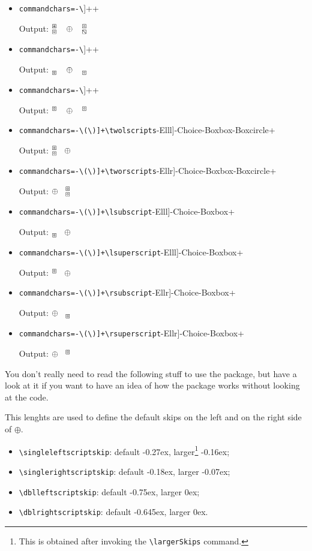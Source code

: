 \documentclass[green,a4paper,oneside,openany,noparindent,noparskip,article,nomatter]{bookest}
\newcommand{\choice}{\oplus} %
\begin{document}
\begin{itemize}
\item \Verb[commandchars=-\[\]]++

Output: $\fourscriptsC{\choice}{\boxast}{\boxbox}{\boxcircle}{\boxbslash}{2ex}{2ex}$
\item \Verb[commandchars=-\[\]]++

Output: $\lrsubscriptsC{\choice}{\boxbox}{\boxcircle}{2ex}{2ex}$
\item \Verb[commandchars=-\[\]]++

Output: $\lrsuperscriptsC{\choice}{\boxbox}{\boxcircle}{2ex}{2ex}$
\item \Verb[commandchars=-\(\)]+\twolscripts[-Elll]{-Choice}{-Boxbox}{-Boxcircle}+

Output: $\twolscripts[2ex]{\choice}{\boxbox}{\boxcircle}$
\item \Verb[commandchars=-\(\)]+\tworscripts[-Ellr]{-Choice}{-Boxbox}{-Boxcircle}+

Output: $\tworscripts[2ex]{\choice}{\boxbox}{\boxcircle}$
\item \Verb[commandchars=-\(\)]+\lsubscript[-Elll]{-Choice}{-Boxbox}+

Output: $\lsubscript[2ex]{\choice}{\boxbox}$
\item \Verb[commandchars=-\(\)]+\lsuperscript[-Elll]{-Choice}{-Boxbox}+

Output: $\lsuperscript[2ex]{\choice}{\boxbox}$
\item \Verb[commandchars=-\(\)]+\rsubscript[-Ellr]{-Choice}{-Boxbox}+

Output: $\rsubscript[2ex]{\choice}{\boxbox}$
\item \Verb[commandchars=-\(\)]+\rsuperscript[-Ellr]{-Choice}{-Boxbox}+

Output: $\rsuperscript[2ex]{\choice}{\boxbox}$
\end{itemize}


You don't really need to read the following stuff to use the package, but have a look at it if you want to have an idea of how the package works without looking at the code.

\label{lengths}
This lenghts are used to define the default skips on the left and on the right side of $\choice$.
\begin{itemize}
\item\Verb+\singleleftscriptskip+: default -0.27ex, larger\footnote{This is obtained after invoking the \verb+\largerSkips+ command.} -0.16ex;
\item\Verb+\singlerightscriptskip+: default -0.18ex, larger -0.07ex;
\item\Verb+\dblleftscriptskip+: default -0.75ex, larger 0ex;
\item\Verb+\dblrightscriptskip+: default -0.645ex, larger 0ex.
\end{itemize}
\end{document}
